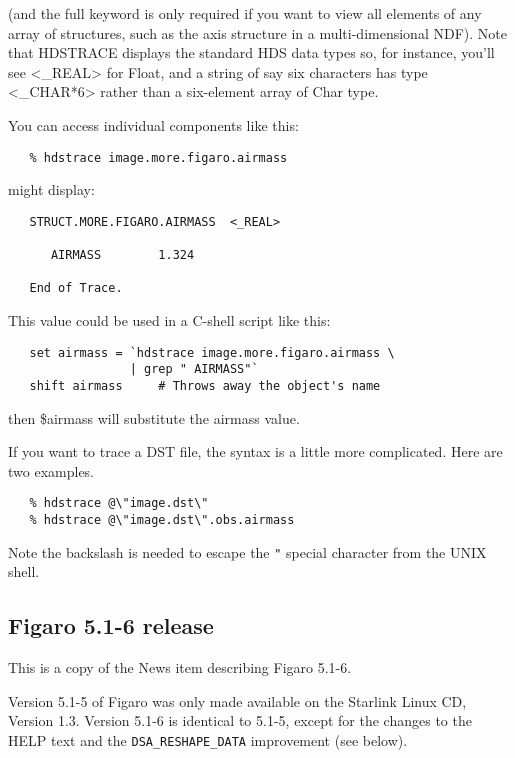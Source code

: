    (and the full keyword is only required if you want to view
   all elements of any array of structures, such as the axis
   structure in a multi-dimensional NDF).  Note that HDSTRACE
   displays the standard HDS data types so, for instance,
   you'll see <\_REAL> for Float, and a string of say six
   characters has type <\_CHAR*6> rather than a six-element
   array of Char type.


   You can access individual components like this:

\begin{verbatim}
   % hdstrace image.more.figaro.airmass
\end{verbatim}

   might display:

\begin{verbatim}
   STRUCT.MORE.FIGARO.AIRMASS  <_REAL>

      AIRMASS        1.324

   End of Trace.
\end{verbatim}

   This value could be used in a C-shell script like this:

\begin{verbatim}
   set airmass = `hdstrace image.more.figaro.airmass \
                 | grep " AIRMASS"`
   shift airmass     # Throws away the object's name
\end{verbatim}

   then \$airmass will substitute the airmass value.


   If you want to trace a DST file, the syntax is a little
   more complicated.  Here are two examples.

\begin{verbatim}
   % hdstrace @\"image.dst\"
   % hdstrace @\"image.dst\".obs.airmass
\end{verbatim}

   Note the backslash is needed to escape the \verb+"+ special
   character from the UNIX shell.


\subsection{\label{news516}Figaro 5.1-6 release}

 This is a copy of the News item describing Figaro 5.1-6.

 Version 5.1-5 of Figaro was only made available on the Starlink Linux
 CD, Version 1.3.  Version 5.1-6 is identical to 5.1-5, except for
 the changes to the HELP text and the \verb+DSA_RESHAPE_DATA+ 
 improvement (see below).

